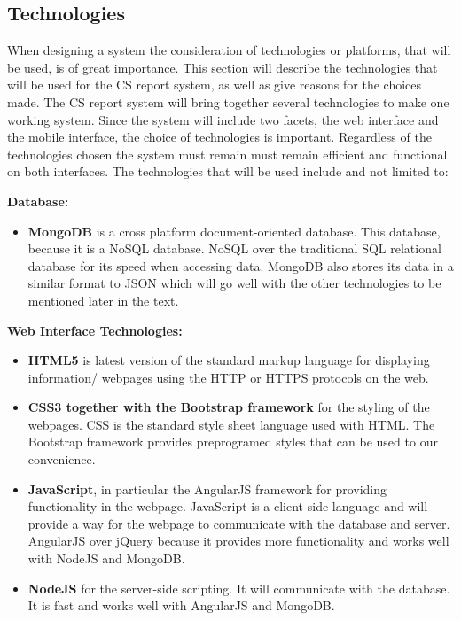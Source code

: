 \documentclass{article}
\begin{document}
		\subsection{Technologies}
		When designing a system the consideration of technologies or platforms, that will be used, is of great importance. This section will describe the technologies that will be used for the CS report system, as well as give reasons for the choices made. The CS report system will bring together several technologies to make one working system. Since the system will include two facets, the web interface and the mobile interface, the choice of technologies is important. Regardless of the technologies chosen the system must remain must remain efficient and functional on both interfaces. The technologies that will be used include and not limited to:
		
		 \textbf{Database:}\par
		 \begin{itemize}
		\item  \textbf{MongoDB} is a cross platform document-oriented database. This database, because it is a NoSQL database. NoSQL over the traditional SQL relational database for its speed when accessing data. MongoDB also stores its data in a similar format to JSON which will go well with the other technologies to be mentioned later in the text.
		\end{itemize}
		
		\textbf{Web Interface Technologies:}\par
		\begin{itemize}
		
		\item \textbf{HTML5} is latest version of the standard markup language for displaying information/ webpages using the HTTP or HTTPS protocols on the web. 
\item \textbf{CSS3 together with the Bootstrap framework} for the styling of the webpages. CSS is the standard style sheet language used with HTML. The Bootstrap framework provides preprogramed styles that can be used to our convenience.
\item \textbf{JavaScript}, in particular the AngularJS framework for providing functionality in the webpage. JavaScript is a client-side language and will provide a way for the webpage to communicate with the database and server. AngularJS over jQuery because it provides more functionality and works well with NodeJS and MongoDB.
\item \textbf{NodeJS} for the server-side scripting. It will communicate with the database. It is fast and works well with AngularJS and MongoDB.
\end{itemize}
\end{document}
